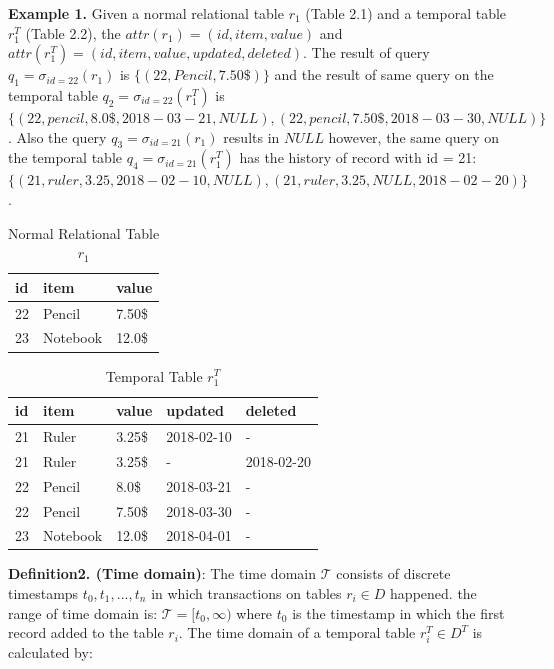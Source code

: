 \textbf{Example 1.} Given a normal relational table $r_1$ (Table 2.1) and a temporal table $r_1^T$ (Table 2.2), the $attr(r_1) = (id, item, value)$ and $attr(r_1^T)= (id, item, value, updated, deleted)$. The result of query $q_1 = \sigma_{id = 22}(r_1)$ is $\{(22,Pencil,7.50\$)\}$ and the result of same query on the temporal table $q_2 = \sigma_{id = 22}(r_1^T)$ is $\{(22,pencil,8.0\$,2018-03-21,NULL),(22,pencil,7.50\$,2018-03-30,NULL)\}$. Also the query $q_3 = \sigma_{id = 21}(r_1)$ results in $NULL$ however, the same query on the temporal table $q_4 = \sigma_{id = 21}(r_1^T)$ has the history of record with id = 21: $\{(21,ruler,3.25,2018-02-10,NULL),(21,ruler,3.25,NULL,2018-02-20)\}$.
\begin{center}

\begin{table}[t]
	\centering
	\caption{Normal Relational Table $r_1$}
	\begin{tabular}{p{4cm}p{4cm}p{4cm}}
		\hline
		id & item      & value  \\ \hline
		22 & Pencil    & 7.50\$ \\
		23 & Notebook & 12.0\$   \\ \hline
	\end{tabular}
\end{table}

\begin{table}[t]
	\centering
	\caption{Temporal Table $r_1^T$}
	\begin{tabular}{p{1cm}p{2cm}p{3cm}p{3cm}p{2cm}}
		\hline
		id & item      & value  & updated  & deleted\\ \hline
		21 & Ruler    & 3.25\$  & 2018-02-10  &  - \\  
		21 & Ruler    & 3.25\$  & -  &  2018-02-20 \\
		22 & Pencil    & 8.0\$  & 2018-03-21  &  - \\
		22 & Pencil    & 7.50\$  & 2018-03-30  &  -\\
		23 & Notebook & 12.0\$  & 2018-04-01 & - \\ \hline
	\end{tabular}
\end{table} 
\end{center}

\textbf{Definition2. (Time domain)}: 
The time domain $\mathcal{T}$ consists of discrete timestamps $t_0,t_1,...,t_n$ in which transactions on tables $r_i \in D$ happened. the range of time domain is: $\mathcal{T} = [t_0, \infty)$ where $t_0$ is the timestamp in which the first record added to the table $r_i$.
The time domain of a temporal table $r_i^T \in D^T $ is calculated by:

